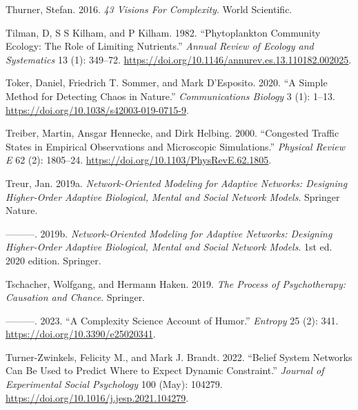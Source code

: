 \documentclass[
  a4paper,
  DIV=11,
  numbers=noendperiod,
  oneside]{scrreprt}
\newlength{\cslhangindent}
\newlength{\cslentryspacingunit} %
\newenvironment{CSLReferences}[2] %
 {%
  \setlength{\parindent}{0pt}
  \ifodd #1
  \let\oldpar\par
  \def\par{\hangindent=\cslhangindent\oldpar}
  \fi
  \setlength{\parskip}{#2\cslentryspacingunit}
 }%
 {}
\begin{document}
\begin{CSLReferences}{1}{0}
\leavevmode{}%
Thurner, Stefan. 2016. \emph{43 Visions For Complexity}. World
Scientific.

\leavevmode{}%
Tilman, D, S S Kilham, and P Kilham. 1982. {``Phytoplankton {Community
Ecology}: {The Role} of {Limiting Nutrients}.''} \emph{Annual Review of
Ecology and Systematics} 13 (1): 349--72.
\url{https://doi.org/10.1146/annurev.es.13.110182.002025}.

\leavevmode{}%
Toker, Daniel, Friedrich T. Sommer, and Mark D'Esposito. 2020. {``A
Simple Method for Detecting Chaos in Nature.''} \emph{Communications
Biology} 3 (1): 1--13. \url{https://doi.org/10.1038/s42003-019-0715-9}.

\leavevmode{}%
Treiber, Martin, Ansgar Hennecke, and Dirk Helbing. 2000. {``Congested
Traffic States in Empirical Observations and Microscopic Simulations.''}
\emph{Physical Review E} 62 (2): 1805--24.
\url{https://doi.org/10.1103/PhysRevE.62.1805}.

\leavevmode{}%
Treur, Jan. 2019a. \emph{Network-{Oriented Modeling} for {Adaptive
Networks}: {Designing Higher-Order Adaptive Biological}, {Mental} and
{Social Network Models}}. {Springer Nature}.

\leavevmode{}%
---------. 2019b. \emph{Network-Oriented Modeling for Adaptive Networks:
Designing Higher-Order Adaptive Biological, Mental and Social Network
Models}. 1st ed. 2020 edition. Springer.

\leavevmode{}%
Tschacher, Wolfgang, and Hermann Haken. 2019. \emph{The Process of
Psychotherapy: Causation and Chance}. Springer.

\leavevmode{}%
---------. 2023. {``A Complexity Science Account of Humor.''}
\emph{Entropy} 25 (2): 341. \url{https://doi.org/10.3390/e25020341}.

\leavevmode{}%
Turner-Zwinkels, Felicity M., and Mark J. Brandt. 2022. {``Belief System
Networks Can Be Used to Predict Where to Expect Dynamic Constraint.''}
\emph{Journal of Experimental Social Psychology} 100 (May): 104279.
\url{https://doi.org/10.1016/j.jesp.2021.104279}.


\end{CSLReferences}
\end{document}
